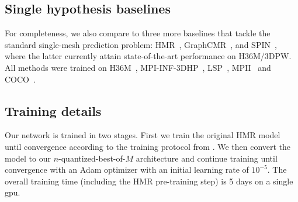 \subsection{Single hypothesis baselines}\label{s:single_baselines}
For completeness, we also compare to three more baselines that tackle the standard single-mesh prediction problem:
HMR~\cite{kanazawa18end-to-end}, GraphCMR~\cite{pavlakos18learning}, and SPIN~\cite{kolotouros19learning}, where the latter currently attain state-of-the-art performance on H36M/3DPW. All methods were trained on H36M~\cite{ionescu2013human3}, MPI-INF-3DHP~\cite{mono-3dhp2017}, LSP~\cite{Johnson11}, MPII~\cite{andriluka14cvpr} and COCO~\cite{lin2014microsoft}.



% 


\subsection{Training details}

Our network is trained in two stages. First we train the original HMR model until convergence according to the training protocol from \cite{kolotouros19convolutional}. We then convert the model to our $n$-quantized-best-of-$M$ architecture and continue training until convergence
with an Adam optimizer with an initial learning rate of $10^{-5}$. The overall training time (including the HMR pre-training step) is 5 days on a single gpu.

